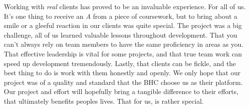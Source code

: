 \documentclass{l3proj}
\begin{document}
Working with \textit{real} clients has proved to be an invaluable experience. For all of us. It's one thing to receive an \textit{A} from a piece of coursework, but to bring about a smile or a gleeful reaction in our clients was quite special. The project was a big challenge, all of us learned valuable lessons throughout development. That you can't always rely on team members to have the same proficiency in areas as you. That effective leadership is vital for some projects, and that true team work can speed up development tremendously. Lastly, that clients can be fickle, and the best thing to do is work with them honestly and openly. We only hope that our project was of a quality and standard that the BHC choose us as their platform. Our project and effort will hopefully bring a tangible difference to their efforts, that ultimately benefits peoples lives. That for us, is rather special.


\newpage


\end{document}
